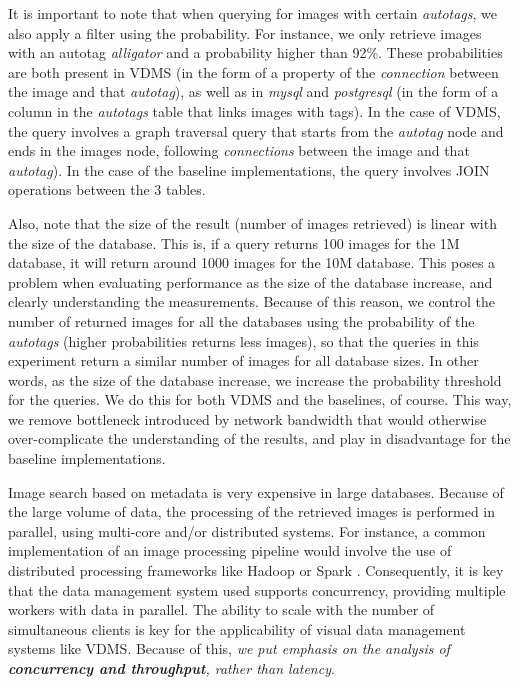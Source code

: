 It is important to note that when querying for images with certain
\textit{autotags}, we also apply a filter using the probability.
For instance, we only retrieve images with an autotag \textit{alligator}
and a probability higher than 92\%.
These probabilities are both present in VDMS (in the form of a property
of the \textit{connection} between the image and that \textit{autotag}),
as well as in \textit{mysql} and \textit{postgresql} (in the form of a column in the
\textit{autotags} table that links images with tags).
In the case of VDMS, the query involves a graph traversal query that starts
from the \textit{autotag} node and ends in the images node,
following \textit{connections} between the image and that \textit{autotag}).
In the case of the baseline implementations,
the query involves JOIN operations between the 3 tables.

Also, note that the size of the result (number of images retrieved)
is linear with the size of the database. This is, if a query returns 100 images
for the 1M database, it will return around 1000 images for the 10M database.
This poses a problem when evaluating performance as the size of the database increase,
and clearly understanding the measurements.
Because of this reason, we control the number of returned images for all the
databases using the probability of the \textit{autotags}
(higher probabilities returns less images), so that the queries in
this experiment return a similar number of images for all database sizes.
In other words, as the size of the database increase, we increase the probability
threshold for the queries. We do this for both VDMS and the baselines, of course.
This way, we remove bottleneck introduced by network bandwidth that would
otherwise over-complicate the understanding of the results,
and play in disadvantage for the baseline implementations.

Image search based on metadata is very expensive in large databases.
Because of the large volume of data, the processing of the retrieved images
is performed in parallel, using multi-core and/or distributed systems.
For instance, a common implementation of an image processing pipeline
would involve the use of distributed processing frameworks
like Hadoop \cite{hadoop} or Spark \cite{spark}.
Consequently, it is key that the data management system used supports
concurrency, providing multiple workers with data in parallel.
The ability to scale with the number of simultaneous clients is key for the
applicability of visual data management systems like VDMS.
Because of this, \textit{we put emphasis on the analysis of
\textbf{concurrency and throughput}, rather than latency}.


